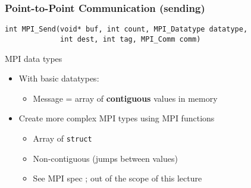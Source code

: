 \documentclass[xcolor={x11names,svgnames,psnames}]{beamer}
\begin{document}
\begin{frame}[fragile=singleslide]
  \frametitle{Point-to-Point Communication (sending)}

\begin{verbatim}
int MPI_Send(void* buf, int count, MPI_Datatype datatype,
             int dest, int tag, MPI_Comm comm)
\end{verbatim}

  \begin{alertblock}{MPI data types}
    \begin{itemize}
    \item With basic datatypes:
      \begin{itemize}
      \item Message = array of \textbf{contiguous} values in memory
      \end{itemize}

    \item Create more complex MPI types using MPI functions
      \begin{itemize}
      \item Array of \texttt{struct}
      \item Non-contiguous (jumps between values)
      \item See MPI spec ; out of the scope of this lecture
      \end{itemize}
    \end{itemize}
  \end{alertblock}
\end{frame}

\end{document}

